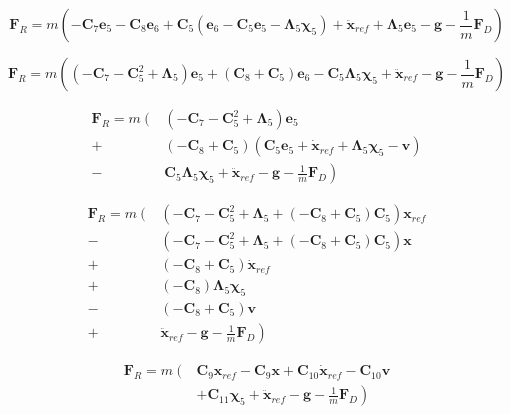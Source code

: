 \[
\mathbf{F}_{R}
= m \left(
	-\mathbf{C}_7 \mathbf{e}_5 - \mathbf{C}_8 \mathbf{e}_6
	+ \mathbf{C}_5 \left( \mathbf{e}_6 - \mathbf{C}_5 \mathbf{e}_5 - \boldsymbol\Lambda_5 \boldsymbol\chi_5 \right)
	+ \ddot{\mathbf{x}}_{ref}
	+ \boldsymbol\Lambda_5 \mathbf{e}_5
	- \mathbf{g}
	- \frac{1}{m} \mathbf{F}_{D}
\right)
\]

\[
\mathbf{F}_{R}
= m \left(
	\left( -\mathbf{C}_7 - \mathbf{C}_5^2 + \boldsymbol\Lambda_5\right) \mathbf{e}_5 +
	\left( \mathbf{C}_8 + \mathbf{C}_5 \right) \mathbf{e}_6 
	- \mathbf{C}_5 \boldsymbol\Lambda_5 \boldsymbol\chi_5
	+ \ddot{\mathbf{x}}_{ref}
	- \mathbf{g}
	- \frac{1}{m} \mathbf{F}_{D}
\right)
\]

\begin{align}\nonumber
\mathbf{F}_{R}
= m \left( \right. & \left( -\mathbf{C}_7 - \mathbf{C}_5^2 + \boldsymbol\Lambda_5 \right) \mathbf{e}_5 \\\nonumber
	+ &\left( -\mathbf{C}_8 + \mathbf{C}_5 \right) \left( \mathbf{C}_5 \mathbf{e}_5 + \dot{\mathbf{x}}_{ref} + \boldsymbol\Lambda_5 \boldsymbol\chi_5 - \mathbf{v}\right) \\\nonumber
	- &\left. \mathbf{C}_5 \boldsymbol\Lambda_5 \boldsymbol\chi_5
	+ \ddot{\mathbf{x}}_{ref}
	- \mathbf{g}
	- \frac{1}{m} \mathbf{F}_{D}
\right)
\end{align}

\begin{align}\nonumber
\mathbf{F}_{R}
= m \left( \right. & \left( -\mathbf{C}_7 - \mathbf{C}_5^2 + \boldsymbol\Lambda_5 + \left( -\mathbf{C}_8 + \mathbf{C}_5 \right) \mathbf{C}_5 \right) \mathbf{x}_{ref} \\\nonumber
	- &\left( -\mathbf{C}_7 - \mathbf{C}_5^2 + \boldsymbol\Lambda_5 + \left( -\mathbf{C}_8 + \mathbf{C}_5 \right) \mathbf{C}_5 \right) \mathbf{x} \\\nonumber
	+ &\left( -\mathbf{C}_8 + \mathbf{C}_5 \right) \dot{\mathbf{x}}_{ref} \\\nonumber
	+ &\left( -\mathbf{C}_8 \right) \boldsymbol\Lambda_5 \boldsymbol\chi_5 \\\nonumber
	- &\left( -\mathbf{C}_8 + \mathbf{C}_5 \right) \mathbf{v} \\\nonumber
	+ &\left. \ddot{\mathbf{x}}_{ref} - \mathbf{g} - \frac{1}{m} \mathbf{F}_{D}
\right)
\end{align}

\begin{align}\nonumber
\mathbf{F}_{R}
= m \left( \right. & \mathbf{C}_9 \mathbf{x}_{ref} - \mathbf{C}_9 \mathbf{x} + \mathbf{C}_{10} \dot{\mathbf{x}}_{ref} - \mathbf{C}_{10} \mathbf{v} \\\nonumber
	& + \mathbf{C}_{11} \boldsymbol\chi_5 + \left. \ddot{\mathbf{x}}_{ref} - \mathbf{g} - \frac{1}{m} \mathbf{F}_{D}
\right)
\end{align}

